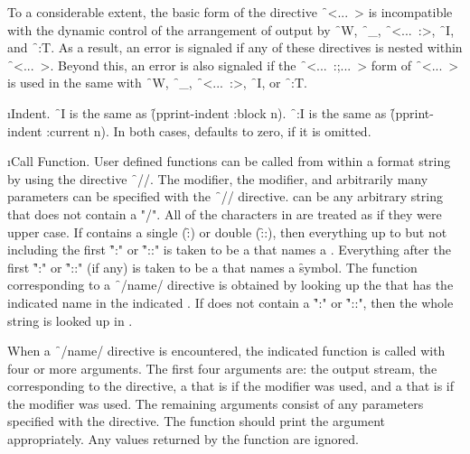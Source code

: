 To a considerable extent, the basic form of the directive \f{~<...~>} is
incompatible with the dynamic control of the arrangement of output by
\f{~W}, \f{~_}, \f{~<...~:>}, \f{~I}, and \f{~:T}.  As a result, an error 
is signaled if any of these directives is nested within \f{~<...~>}.  
Beyond this, an error is also signaled if the \f{~<...~:;...~>} form of
\f{~<...~>} is used in the same  with 
\f{~W}, \f{~_}, \f{~<...~:>}, \f{~I}, or \f{~:T}.
 
 
\i{Indent}.
\f{~I}  is the same as \f{(pprint-indent :block n)}.
\f{~:I} is the same as \f{(pprint-indent :current n)}.
In both cases,  defaults to zero, if it is omitted.
 

\i{Call Function}. User defined functions can be called from within a format
string by using the directive \f{~//}.
The  modifier, the  modifier, and arbitrarily many parameters 
can be specified with the \f{~//} directive.
 can be any arbitrary string that does not contain a "/".
All of the characters in  are treated as if they were upper case.
If  contains a single  (\f{:}) or double  (\f{::}),
then everything up to but not including the first \f{":"} or \f{"::"}
is taken to be a  that names a .
Everything after the first \f{":"} or \f{"::"} (if any) is taken to be a 
 that names a \f{symbol}.  The function corresponding to a 
\f{~/name/} directive is obtained by looking up the 
that has the indicated name in the indicated .
If  does not contain a \f{":"} or \f{"::"},
then the whole  string is looked up in . 

When a \f{~/name/} directive is encountered,
the indicated function is called with four or more arguments.
The first four arguments are:
     the output stream,
     the  corresponding to the directive,
     a  that is  if the  modifier was used,
 and a  that is  if the  modifier was used.
The remaining arguments consist of any parameters specified with the directive.
The function should print the argument appropriately.
Any values returned by the function are ignored.
 
